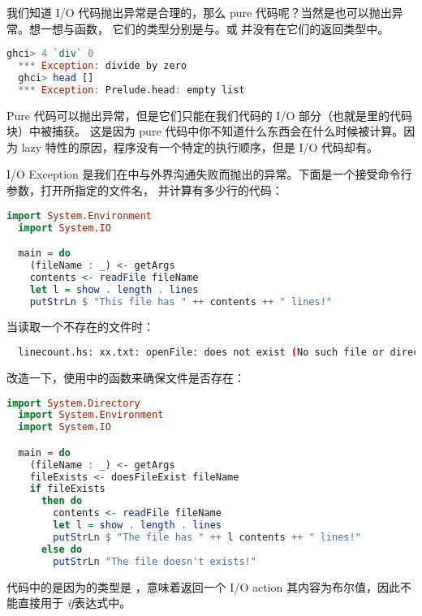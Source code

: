 \documentclass[./main.tex]{subfiles}
\begin{document}
我们知道 I/O 代码抛出异常是合理的，那么 pure 代码呢？当然是也可以抛出异常。想一想与函数，
它们的类型分别是与。或
并没有在它们的返回类型中。

\begin{lstlisting}[language=Haskell]
  ghci> 4 `div` 0
  *** Exception: divide by zero
  ghci> head []
  *** Exception: Prelude.head: empty list
\end{lstlisting}

Pure 代码可以抛出异常，但是它们只能在我们代码的 I/O 部分（也就是里的代码块）中被捕获。
这是因为 pure 代码中你不知道什么东西会在什么时候被计算。因为 lazy 特性的原因，程序没有一个特定的执行顺序，但是
I/O 代码却有。

I/O Exception 是我们在中与外界沟通失败而抛出的异常。下面是一个接受命令行参数，打开所指定的文件名，
并计算有多少行的代码：

\begin{lstlisting}[language=Haskell]
  import System.Environment
  import System.IO

  main = do
    (fileName : _) <- getArgs
    contents <- readFile fileName
    let l = show . length . lines
    putStrLn $ "This file has " ++ contents ++ " lines!"
\end{lstlisting}

当读取一个不存在的文件时：

\begin{lstlisting}[language=Bash]
  % runhaskell linecount.hs xx.txt
  linecount.hs: xx.txt: openFile: does not exist (No such file or directory)
\end{lstlisting}

改造一下，使用中的函数来确保文件是否存在：

\begin{lstlisting}[language=Haskell]
  import System.Directory
  import System.Environment
  import System.IO

  main = do
    (fileName : _) <- getArgs
    fileExists <- doesFileExist fileName
    if fileExists
      then do
        contents <- readFile fileName
        let l = show . length . lines
        putStrLn $ "The file has " ++ l contents ++ " lines!"
      else do
        putStrLn "The file doesn't exists!"
\end{lstlisting}

代码中的是因为的类型是
，意味着返回一个 I/O action 其内容为布尔值，因此不能直接用于
\textit{if}表达式中。
\end{document}
